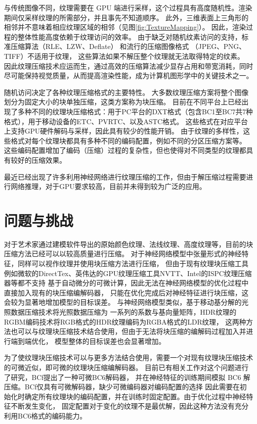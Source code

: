 与传统图像不同，纹理需要在 GPU 端进行采样，这个过程具有高度随机性。渲染期间仅采样纹理的所需部分，并且事先不知道顺序。
此外，三维表面上三角形的相邻并不意味着相应纹理区域的相邻（见图\ref{fig:TextureMapping}）。
因此，渲染过程的整体性能高度依赖于纹理访问的效率。
由于缺乏对随机纹素访问的支持，标准压缩算法（RLE、LZW、Deflate） 和流行的压缩图像格式 （JPEG、PNG、TIFF）不适用于纹理，
这些算法如果不解压整个纹理就无法取得特定的纹素。
因此纹理压缩技术应运而生，通过高效的压缩算法减少显存占用和带宽消耗，同时尽可能保持视觉质量，从而提高渲染性能，成为计算机图形学中的关键技术之一。

随机访问决定了各种纹理压缩格式的主要特性。
大多数纹理压缩方案将整个图像划分为固定大小的块单独压缩，这类方案称为块压缩。
目前在不同平台上已经出现了多种不同的纹理块压缩格式：用于PC平台的DXT格式（包含BC1至BC7共7种格式），用于移动设备的ETC、PVRTC、以及ASTC格式。
这些格式在对应平台上支持GPU硬件解码与采样，因此具有较少的性能开销。
由于纹理的多样性，这些格式对每个纹理块都具有多种不同的编码配置，例如不同的分区压缩方案等。
这些编码配置增加了编码（压缩）过程的复杂性，但也使得对不同类型的纹理都具有较好的压缩效果。

最近已经出现了许多利用神经网络进行纹理压缩的工作，但由于解压缩过程需要进行网络推理，对于GPU要求较高，目前并未得到较为广泛的应用。

\section{问题与挑战}

对于艺术家通过建模软件导出的原始颜色纹理、法线纹理、高度纹理等，目前的块压缩方法已经可以以较高质量进行压缩。
对于神经网络模型中张量形式的神经特征，同样可以视作纹理并使用块压缩方法进行压缩，
但由于现有纹理块压缩工具例如微软的DirectTex、英伟达的GPU纹理压缩工具NVTT、Intel的ISPC纹理压缩器等都不支持
基于自动微分的可微计算，因此无法在神经网络模型的优化过程中直接加入现有的块压缩编解码器，
只能在优化完成后对神经特征进行块压缩，这会较为显著地增加模型的目标误差。
与神经网络模型类似，基于移动基分解的光照数据压缩技术\cite{silvennoinen2021moving}将光照数据压缩为
一系列的系数与基向量矩阵，HDR纹理的RGBM编码技术将RGB格式的HDR纹理编码为RGBA格式的LDR纹理，
这两种方法也可以与纹理块压缩技术结合使用，但由于无法将块压缩的编解码过程加入并进行端到端优化，
模型整体的目标误差也会显著增加。

为了使纹理块压缩技术可以与更多方法结合使用，需要一个对现有纹理块压缩技术的可微近似，即可微的纹理块压缩编解码器。
目前已有相关工作对这个问题进行了研究，BCf\cite{weinreich2024real}提出了一种可微BC6解码器，
并在神经特征的训练期间模拟 BC6 解压缩。BCf\cite{weinreich2024real}仅具有可微解码器，缺少可微编码器对编码配置的选择
因此需要在初始化时确定所有纹理块的编码配置，并在训练时固定配置。由于优化过程中神经特征不断发生变化，
固定配置对于变化的纹理不是最优解，因此这种方法没有充分利用BC6格式的编码能力。

